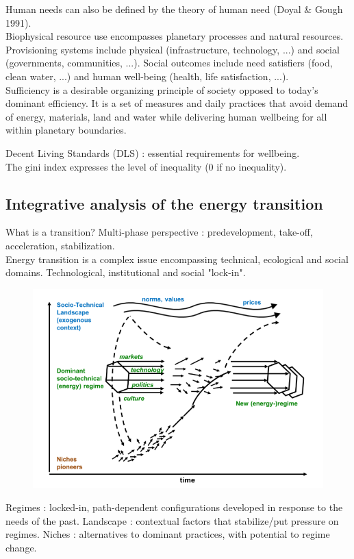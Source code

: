 \documentclass[../main.tex]{subfiles}
\begin{document}
Human needs can also be defined by the theory of human need (Doyal \& Gough 1991).\\

Biophysical resource use encompasses planetary processes and natural resources. Provisioning systems include physical (infrastructure, technology, ...) and social (governments, communities, ...). Social outcomes include need satisfiers (food, clean water, ...) and human well-being (health, life satisfaction, ...).\\

Sufficiency is a desirable organizing principle of society opposed to today's dominant efficiency. It is a set of measures and daily practices that avoid demand of energy, materials, land and water while delivering human wellbeing for all within planetary boundaries.

Decent Living Standards (DLS) : essential requirements for wellbeing. \\

The gini index expresses the level of inequality (0 if no inequality).\\

\subsection{Integrative analysis of the energy transition}
What is a transition? Multi-phase perspective : predevelopment, take-off, acceleration, stabilization.\\
Energy transition is a complex issue encompassing technical, ecological and social domains. Technological, institutional and social "lock-in". 

\begin{figure}[hbt!]
    \centering
    \includegraphics[width=0.5\linewidth]{IMAGES/NRJ_supply/Screenshot from 2025-04-16 08-37-13.png}
\end{figure}

Regimes : locked-in, path-dependent configurations developed in response to the needs of the past. Landscape : contextual factors that stabilize/put pressure on regimes. Niches : alternatives to dominant practices, with potential to regime change. \\
\end{document}
